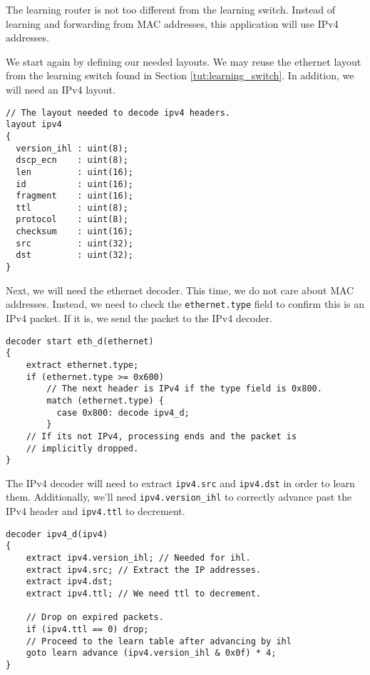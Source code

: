The learning router is not too different from the learning switch. Instead of
learning and forwarding from MAC addresses, this application will use IPv4
addresses.

We start again by defining our needed layouts. We may reuse the ethernet layout
from the learning switch found in Section \ref{tut:learning_switch}. In
addition, we will need an IPv4 layout.

\begin{codepage}
\begin{lstlisting}
// The layout needed to decode ipv4 headers.
layout ipv4
{
  version_ihl : uint(8);
  dscp_ecn    : uint(8);
  len         : uint(16);
  id          : uint(16);
  fragment    : uint(16);
  ttl         : uint(8);
  protocol    : uint(8);
  checksum    : uint(16);
  src         : uint(32);
  dst         : uint(32);
}
\end{lstlisting}
\end{codepage}

Next, we will need the ethernet decoder. This time, we do not care about MAC
addresses. Instead, we need to check the \texttt{ethernet.type} field to confirm
this is an IPv4 packet. If it is, we send the packet to the IPv4 decoder.

\begin{codepage}
\begin{lstlisting}
decoder start eth_d(ethernet)
{
	extract ethernet.type;
	if (ethernet.type >= 0x600)
	  	// The next header is IPv4 if the type field is 0x800.
	    match (ethernet.type) {
	      case 0x800: decode ipv4_d;
	    }
	// If its not IPv4, processing ends and the packet is
	// implicitly dropped.
}
\end{lstlisting}
\end{codepage}

The IPv4 decoder will need to extract \texttt{ipv4.src} and \texttt{ipv4.dst} in
order to learn them. Additionally, we'll need \texttt{ipv4.version\_ihl} to
correctly advance past the IPv4 header and \texttt{ipv4.ttl} to decrement.

\begin{codepage}
\begin{lstlisting}
decoder ipv4_d(ipv4)
{
	extract ipv4.version_ihl; // Needed for ihl.
	extract ipv4.src; // Extract the IP addresses.
	extract ipv4.dst;
	extract ipv4.ttl; // We need ttl to decrement.

	// Drop on expired packets.
	if (ipv4.ttl == 0) drop;
	// Proceed to the learn table after advancing by ihl
	goto learn advance (ipv4.version_ihl & 0x0f) * 4;
}
\end{lstlisting}
\end{codepage}

